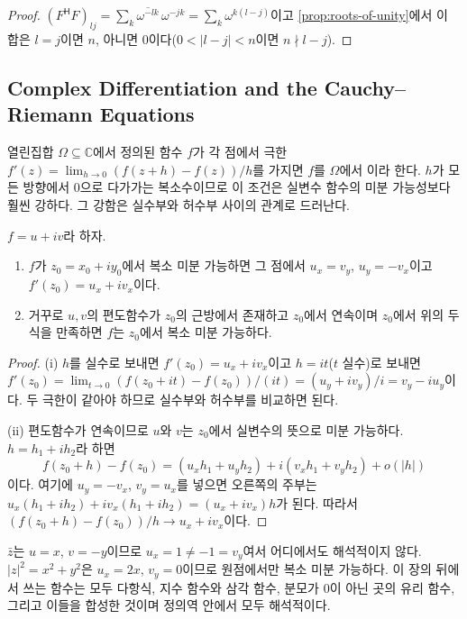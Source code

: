 \begin{proof}
$(F^{\mathsf H}F)_{lj}=\sum_k\overline{\omega^{-lk}}\,\omega^{-jk}=\sum_k\omega^{k(l-j)}$이고 \cref{prop:roots-of-unity}에서 이 합은 $l=j$이면 $n$, 아니면 $0$이다($0<|l-j|<n$이면 $n\nmid l-j$).
\end{proof}

\subsection{Complex Differentiation and the Cauchy--Riemann Equations}

열린집합 $\Omega\subseteq\mathbb{C}$에서 정의된 함수 $f$가 각 점에서 극한 $f'(z)=\lim_{h\to0}(f(z+h)-f(z))/h$를 가지면 $f$를 $\Omega$에서 이라 한다. $h$가 모든 방향에서 $0$으로 다가가는 복소수이므로 이 조건은 실변수 함수의 미분 가능성보다 훨씬 강하다. 그 강함은 실수부와 허수부 사이의 관계로 드러난다.

\begin{proposition}
\label{prop:cauchy-riemann}
$f=u+iv$라 하자.
\begin{enumerate}
\item $f$가 $z_0=x_0+iy_0$에서 복소 미분 가능하면 그 점에서 $u_x=v_y$, $u_y=-v_x$이고 $f'(z_0)=u_x+iv_x$이다.
\item 거꾸로 $u,v$의 편도함수가 $z_0$의 근방에서 존재하고 $z_0$에서 연속이며 $z_0$에서 위의 두 식을 만족하면 $f$는 $z_0$에서 복소 미분 가능하다.
\end{enumerate}
\end{proposition}

\begin{proof}
(i) $h$를 실수로 보내면 $f'(z_0)=u_x+iv_x$이고 $h=it$($t$ 실수)로 보내면 $f'(z_0)=\lim_{t\to0}(f(z_0+it)-f(z_0))/(it)=(u_y+iv_y)/i=v_y-iu_y$이다. 두 극한이 같아야 하므로 실수부와 허수부를 비교하면 된다.

(ii) 편도함수가 연속이므로 $u$와 $v$는 $z_0$에서 실변수의 뜻으로 미분 가능하다. $h=h_1+ih_2$라 하면
\[
f(z_0+h)-f(z_0)=(u_xh_1+u_yh_2)+i(v_xh_1+v_yh_2)+o(|h|)
\]
이다. 여기에 $u_y=-v_x$, $v_y=u_x$를 넣으면 오른쪽의 주부는 $u_x(h_1+ih_2)+iv_x(h_1+ih_2)=(u_x+iv_x)h$가 된다. 따라서 $(f(z_0+h)-f(z_0))/h\to u_x+iv_x$이다.
\end{proof}

$\bar z$는 $u=x$, $v=-y$이므로 $u_x=1\ne-1=v_y$여서 어디에서도 해석적이지 않다. $|z|^2=x^2+y^2$은 $u_x=2x$, $v_y=0$이므로 원점에서만 복소 미분 가능하다. 이 장의 뒤에서 쓰는 함수는 모두 다항식, 지수 함수와 삼각 함수, 분모가 $0$이 아닌 곳의 유리 함수, 그리고 이들을 합성한 것이며 정의역 안에서 모두 해석적이다.


